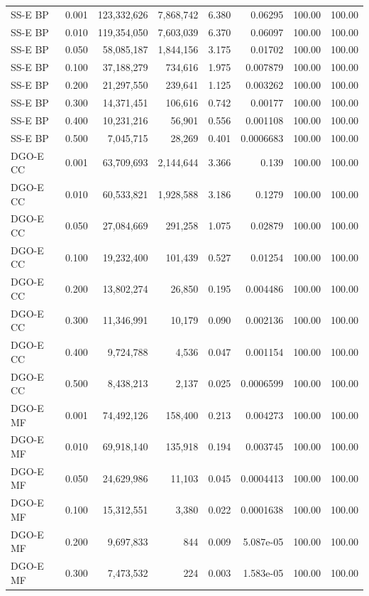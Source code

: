\begin{longtable}{lrrrrrrr}
SS-E BP & 0.001 & 123,332,626 & 7,868,742 & 6.380 & 0.06295 & 100.00 & 100.00 \\
SS-E BP & 0.010 & 119,354,050 & 7,603,039 & 6.370 & 0.06097 & 100.00 & 100.00 \\
SS-E BP & 0.050 & 58,085,187 & 1,844,156 & 3.175 & 0.01702 & 100.00 & 100.00 \\
SS-E BP & 0.100 & 37,188,279 & 734,616 & 1.975 & 0.007879 & 100.00 & 100.00 \\
SS-E BP & 0.200 & 21,297,550 & 239,641 & 1.125 & 0.003262 & 100.00 & 100.00 \\
SS-E BP & 0.300 & 14,371,451 & 106,616 & 0.742 & 0.00177 & 100.00 & 100.00 \\
SS-E BP & 0.400 & 10,231,216 & 56,901 & 0.556 & 0.001108 & 100.00 & 100.00 \\
SS-E BP & 0.500 & 7,045,715 & 28,269 & 0.401 & 0.0006683 & 100.00 & 100.00 \\
DGO-E CC & 0.001 & 63,709,693 & 2,144,644 & 3.366 & 0.139 & 100.00 & 100.00 \\
DGO-E CC & 0.010 & 60,533,821 & 1,928,588 & 3.186 & 0.1279 & 100.00 & 100.00 \\
DGO-E CC & 0.050 & 27,084,669 & 291,258 & 1.075 & 0.02879 & 100.00 & 100.00 \\
DGO-E CC & 0.100 & 19,232,400 & 101,439 & 0.527 & 0.01254 & 100.00 & 100.00 \\
DGO-E CC & 0.200 & 13,802,274 & 26,850 & 0.195 & 0.004486 & 100.00 & 100.00 \\
DGO-E CC & 0.300 & 11,346,991 & 10,179 & 0.090 & 0.002136 & 100.00 & 100.00 \\
DGO-E CC & 0.400 & 9,724,788 & 4,536 & 0.047 & 0.001154 & 100.00 & 100.00 \\
DGO-E CC & 0.500 & 8,438,213 & 2,137 & 0.025 & 0.0006599 & 100.00 & 100.00 \\
DGO-E MF & 0.001 & 74,492,126 & 158,400 & 0.213 & 0.004273 & 100.00 & 100.00 \\
DGO-E MF & 0.010 & 69,918,140 & 135,918 & 0.194 & 0.003745 & 100.00 & 100.00 \\
DGO-E MF & 0.050 & 24,629,986 & 11,103 & 0.045 & 0.0004413 & 100.00 & 100.00 \\
DGO-E MF & 0.100 & 15,312,551 & 3,380 & 0.022 & 0.0001638 & 100.00 & 100.00 \\
DGO-E MF & 0.200 & 9,697,833 & 844 & 0.009 & 5.087e-05 & 100.00 & 100.00 \\
DGO-E MF & 0.300 & 7,473,532 & 224 & 0.003 & 1.583e-05 & 100.00 & 100.00 \\

\end{longtable}
